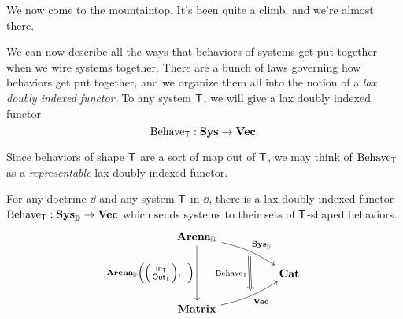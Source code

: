 \documentclass[DynamicalBook]{subfiles}
\begin{document}
We now come to the mountaintop. It's been quite a climb, and we're almost there.

We can now describe all the ways that behaviors of systems get put together when
we wire systems together. There are a bunch of laws governing how behaviors get
put together, and we organize them all into the notion of a \emph{lax doubly
  indexed functor}. To any system $\mathsf{T}$, we will give a lax doubly indexed
functor
$$\mathrm{Behave}_{\mathsf{T}} : \textbf{Sys} \to \textbf{Vec}.$$

Since behaviors of shape $\mathsf{T}$ are a sort of map out of $\mathsf{T}$, we may
think of $\mathrm{Behave}_{\mathsf{T}}$ as a \emph{representable} lax doubly indexed
functor. 


\begin{theorem}\label{thm.representable_discrete}
  For any doctrine $\dd$ and any system $\mathsf{T}$ in $\dd$, there is a lax doubly indexed functor 
$\mathrm{Behave}_{\mathsf{T}} : \textbf{Sys}_{\mathbb{D}} \to \textbf{Vec}$
which sends systems to their sets of $\mathsf{T}$-shaped behaviors.
\[\begin{tikzcd}
	{\Cat{Arena}_{\dd}} \\
	&& {\Cat{Cat}} \\
	{\Cat{Matrix}}
	\arrow[""{name=0, anchor=center, inner sep=0}, "{\Cat{Sys}_{\dd}}", from=1-1,
  to=2-3, bend left = 10]
	\arrow[""{name=1, anchor=center, inner sep=0}, "{\Cat{Vec}}"', from=3-1,
  to=2-3, bend right = 10]
	\arrow["{\Cat{Arena}_{\dd}\left(\littlelens{\In{T}}{\Out{T}},-\right)}"', from=1-1, to=3-1]
	\arrow["{\Fun{Behave}_{\Sys{T}}}"', shorten <=4pt, shorten >=4pt, Rightarrow, from=0, to=1]
\end{tikzcd}\]
\end{theorem}
\end{document}
